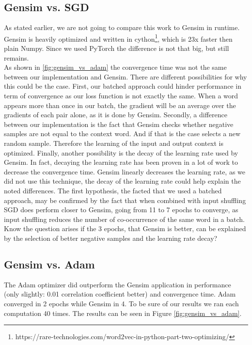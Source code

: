 \subsection{Gensim vs. SGD}
As stated earlier, we are not going to compare this work to Gensim in runtime. Gensim is heavily optimized and written in cython\footnote{https://rare-technologies.com/word2vec-in-python-part-two-optimizing/}, which is 23x faster then plain Numpy. Since we used PyTorch the difference is not that big, but still remains. \\
As shown in \ref{fig:gensim_vs_adam} the convergence time was not the same between our implementation and Gensim. There are different possibilities for why this could be the case. First, our batched approach could hinder performance in term of convergence as our loss function is not exactly the same. When a word appears more than once in our batch, the gradient will be an average over the gradients of each pair alone, as it is done by Gensim. Secondly, a difference between our implementation is the fact that Gensim checks whether negative samples are not equal to the context word. And if that is the case selects a new random sample. Therefore the learning of the input and output context is optimized. Finally, another possibility is the decay of the learning rate used by Gensim. In fact, decaying the learning rate has been proven in a lot of work to decrease the convergence time. Gensim linearly decreases the learning rate, as we did not use this technique, the decay of the learning rate could help explain the noted differences.
The first hypothesis, the facted that we used a batched approach, may be confirmed by the fact that when combined with input shuffling SGD does perform closer to Gensim, going from 11 to 7 epochs to converge, as input shuffling reduces the number of co-occurrence of the same word in a batch. 
Know the question arises if the 3 epochs, that Gensim is better, can be explained by the selection of better negative samples and the learning rate decay?

\subsection{Gensim vs. Adam}
The Adam optimizer did outperform the Gensim application in performance (only slightly: 0.01 correlation coefficient better) and convergence time. Adam converged in 2 epochs while Gensim in 4. To be sure of our results we ran each computation 40 times. The results can be  seen in Figure \ref{fig:gensim_vs_adam}.

